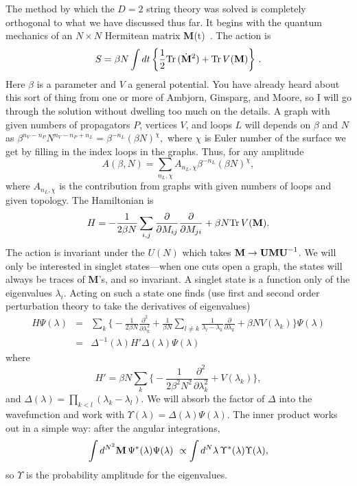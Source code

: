 The method by which the $D=2$ string theory was solved is completely
orthogonal to what we have discussed thus far.  It begins with the
quantum mechanics of an $N \times N$ Hermitean matrix
{\bf M}(t)~\cite{BIPZ}.  The action is
\begin{equation}
S = \beta N \int dt \, \biggl\{ \frac{1}{2} {\rm Tr}\,(\dot {\bf
M}^2)  + {\rm Tr}\, V({\bf M})\biggr\}\ .
\end{equation}
Here $\beta$ is a parameter and $V$ a general potential. 
You have already heard about this sort of thing from one or more of
Ambjorn, Ginsparg, and Moore, so I will go through the solution
without dwelling too much on the details.
A graph with given numbers of propagators $P$, vertices $V$, and
loops $L$ will depends on $\beta$ and $N$ as
$\beta^{n_V - n_P} N^{n_V - n_P + n_L} = \beta^{-n_L}
(\beta N)^{\chi},$ where $\chi$ is Euler number of the surface we
get by filling in the index loops in the graphs.  Thus, for any
amplitude
\begin{equation}
A(\beta, N) = \sum_{n_L, \chi} A_{n_L, \chi} \beta^{-n_L} 
(\beta N)^{\chi},
\label{bN}
\end{equation}
where $A_{n_L, \chi}$ is the contribution from graphs with given
numbers of loops and given topology.
The Hamiltonian is 
\begin{equation}
H = -\frac{1}{2\beta N} \sum_{i,j} \frac{\partial}{\partial M_{ij}}
\frac{\partial}{\partial M_{ji}} + \beta N {\rm Tr}\, V({\bf M}).
\end{equation}
The action is invariant under the $U(N)$ which takes ${\bf M} \to 
{\bf UMU}^{-1}$.  We will only be
interested in singlet states---when one cuts open a graph, the states
will always be traces of {\bf M}'s, and so invariant. 
A singlet state is a function only of the eigenvalues $\lambda_i$.
Acting on such a state one finds (use first and second order
perturbation theory to take the derivatives of eigenvalues)
\begin{eqnarray}
H { \Psi}(\lambda) &=& \sum_k \biggl\{ -\frac{1}{2\beta
N}  \frac{\partial^2}{\partial \lambda_k^2}
+ \frac{1}{\beta N} \sum_{l \neq k} \frac{1}{\lambda_l - \lambda_k}
\frac{\partial}{\partial \lambda_k}
+ \beta N V(\lambda_k) \biggr\} { \Psi}(\lambda) \nonumber\\
&=& \Delta^{-1}(\lambda)H' \Delta(\lambda) { \Psi}(\lambda)
\label{hprime}
\end{eqnarray}
where
\begin{equation}
H' = \beta N \sum_k \biggl\{ -\frac{1}{2\beta^2 N^2}
\frac{\partial^2}{\partial \lambda_k^2}
+ V(\lambda_k) \biggr\}, \label{ffh}
\end{equation}
and $\Delta(\lambda) = \prod_{k < l}(\lambda_k - \lambda_l)$.
We will absorb the factor of $\Delta$ into the wavefunction and work
with ${ \Upsilon}(\lambda) = \Delta(\lambda) { \Psi}(\lambda)$.
The inner product works out in a simple way: after the angular
integrations,
\begin{equation}
\int d^{N^2}{\bf M}\, { \Psi}^*(\lambda) { \Psi}(\lambda)
\ \propto \int d^N \lambda \, { \Upsilon}^*(\lambda)
{ \Upsilon}(\lambda),
\end{equation}
so ${ \Upsilon}$ is the probability amplitude for the eigenvalues.

